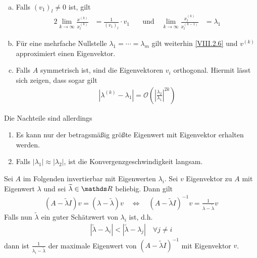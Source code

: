 \begin{Beme}~
  \begin{enumerate}[a)]
  \item Falls $(v_1)_l\neq 0$ ist, gilt
    \begin{alignat}{2}
      \lim_{k\to\infty} \frac{x^{(k)}}{x_l^{(k)}}
      &= \frac{1}{(v_1)_l}\cdot v_1\quad
      &\text{und}\quad\lim_{k\to\infty}\frac{x_l^{(k)}}{x_l^{(k-1)}}
      &=\lambda_1
      \label{VIII.2.6}
    \end{alignat}
  \item Für eine mehrfache Nullstelle $\lambda_1=\dotsb=\lambda_m$
    gilt weiterhin \eqref{VIII.2.6} und
    $v^{(k)}$ approximiert einen Eigenvektor.
  \item Falls $A$ symmetrisch ist,
    sind die Eigenvektoren $v_i$ orthogonal.
    Hiermit lässt sich zeigen, dass sogar gilt
    \begin{gather*}
      \left|\lambda^{(k)}-\lambda_1\right|
      = \mathcal{O}\left(\left|
          \frac{\lambda_2}{\lambda_1}
        \right|^{2k}\right)
    \end{gather*}
  \end{enumerate}
  Die Nachteile sind allerdings
  \begin{enumerate}[1)]
  \item Es kann nur der betragsmäßig größte Eigenwert
    mit Eigenvektor erhalten werden.
  \item Falls $|\lambda_1|\approx|\lambda_2|$,
    ist die Konvergenzgeschwindigkeit langsam.
  \end{enumerate}
\end{Beme}


Sei $A$ im Folgenden invertierbar mit Eigenwerten $\lambda_i$.
Sei $v$ Eigenvektor zu $A$ mit Eigenwert $\lambda$ und
sei $\widetilde{ \lambda}\in\R$ beliebig. Dann gilt
\begin{gather*}
  (A-\widetilde{\lambda}I) v= (\lambda-\widetilde{\lambda})v
  \quad\Leftrightarrow\quad
  (A-\widetilde{\lambda}I)^{-1}v=
  \frac{1}{\lambda-\widetilde{\lambda}}v
\end{gather*}
Falls nun $\widetilde{\lambda}$ ein guter Schätzwert
von $\lambda_i$ ist, d.h.
\begin{gather*}
  |\widetilde{\lambda}-\lambda_i|<|\widetilde{\lambda}-\lambda_j|
  \quad \forall j\neq i
\end{gather*}
dann ist $\frac{1}{\lambda_i-\widetilde{\lambda}}$ 
der maximale Eigenwert von $(A-\widetilde{\lambda}I)^{-1}$
mit Eigenvektor $v$.

